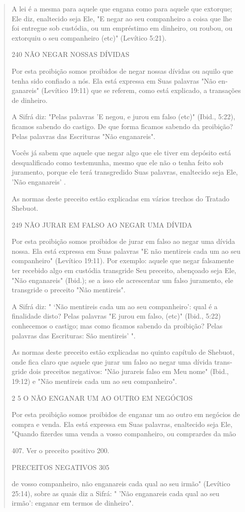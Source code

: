 \begin{quote}
A lei é a mesma para aquele que engana como para aquele que extor­que;
Ele diz, enaltecido seja Ele, "E negar ao seu companheiro a coisa que
lhe foi entregue sob custódia, ou um empréstimo em dinheiro, ou roubou,
ou ex­torquiu o seu companheiro (etc)" (Levítico 5:21).

240 NÃO NEGAR NOSSAS DÍVIDAS

Por esta proibição somos proibidos de negar nossas dívidas ou aqui­lo
que tenha sido confiado a nós. Ela está expressa em Suas palavras "Não
en­ganareis" (Levítico 19:11) que se referem, como está explicado, a
transações de dinheiro.

A Sifrá diz: "Pelas palavras 'E negou, e jurou em falso (etc)" (Ibid.,
5:22), ficamos sabendo do castigo. De que forma ficamos sabendo da
proibi­ção? Pelas palavras das Escrituras "Não enganareis".

Vocês já sabem que aquele que negar algo que ele tiver em depósito está
desqualificado como testemunha, mesmo que ele não o tenha feito sob
juramento, porque ele terá transgredido Suas palavras, enaltecido seja
Ele, 'Não enganareis' .

As normas deste preceito estão explicadas em vários trechos do Tra­tado
Shebuot.

249 NÃO JURAR EM FALSO AO NEGAR UMA DÍVIDA

Por esta proibição somos proibidos de jurar em falso ao negar uma dívida
nossa. Ela está expressa em Suas palavras "E não mentireis cada um ao
seu companheiro" (Levítico 19:11). Por exemplo: aquele que negar
falsamente ter recebido algo em custódia transgride Seu preceito,
abençoado seja Ele, "Não enganareis" (Ibid.); se a isso ele acrescentar
um falso juramento, ele transgride o preceito "Não mentireis".

A Sifrá diz: " `Não mentireis cada um ao seu companheiro': qual é a
finalidade disto? Pelas palavras "E jurou em falso, (etc)" (Ibid., 5:22)
conhe­cemos o castigo; mas como ficamos sabendo da proibição? Pelas
palavras das Escrituras: São mentireis' ".

As normas deste preceito estão explicadas no quinto capítulo de
She­buot, onde fica claro que aquele que jurar um falso ao negar uma
dívida trans­gride dois preceitos negativos: "Não jurareis falso em Meu
nome" (Ibid., 19:12) e "Não mentireis cada um ao seu companheiro".

2 5 O NÃO ENGANAR UM AO OUTRO EM NEGÓCIOS

Por esta proibição somos proibidos de enganar um ao outro em ne­gócios
de compra e venda. Ela está expressa em Suas palavras, enaltecido seja
Ele, "Quando fizerdes uma venda a vosso companheiro, ou comprardes da
mão

407. Ver o preceito positivo 200.

PRECEITOS NEGATIVOS 305

de vosso companheiro, não enganareis cada qual ao seu irmão" (Levítico
25:14), sobre as quais diz a Sifrá: " 'Não enganareis cada qual ao seu
irmão': enganar em termos de dinheiro".
\end{quote}

